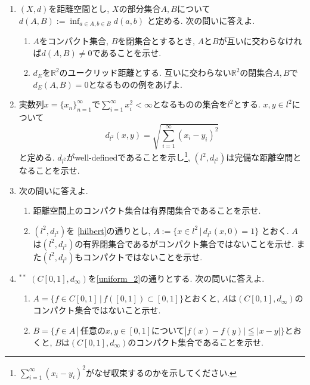 \documentclass[dvipdfmx,a4paper,11pt]{article}
\newcommand{\R}{\mathbb{R}}
\theoremstyle{definition}
\begin{document}
\begin{enumerate}[label=\textbf{問}\ref*{sec-completion}.\arabic*]

\item $(X,d)$を距離空間とし, $X$の部分集合$A,B$について
$d(A,B) := \inf_{a \in A, b \in B} d(a,b)$
と定める. 次の問いに答えよ.
\begin{enumerate}
 \setlength{\parskip}{0cm}
  \setlength{\itemsep}{0pt} 
	\item $A$をコンパクト集合, $B$を閉集合とするとき, $A$と$B$が互いに交わらなければ$d(A,B)\neq 0$であることを示せ.
	\item $d_{E}$を$\R^2$のユークリッド距離とする. 互いに交わらない$\R^2$の閉集合$A,B$で$d_{E}(A,B) =0$となるものの例をあげよ.
\end{enumerate}


 \item  \label{hilbert} 実数列$x = \{ x_n\}_{n=1}^{\infty}$で$\sum_{i=1}^{\infty} x_{i}^{2} < \infty$となるものの集合を$l^2$とする.
 $x,y \in l^2$について
 $$
 d_{ l^2}(x,y) = \sqrt{ \sum_{i=1}^{\infty} (x_i - y_i)^2}
 $$
 と定める. $d_{ l^2}$がwell-definedであることを示し\footnote{$\sum_{i=1}^{\infty} (x_i - y_i)^2$がなぜ収束するのかを示してください.}, $(l^2,d_{ l^2})$は完備な距離空間となることを示せ. %
 
\item  次の問いに答えよ.
	\begin{enumerate}
	\setlength{\parskip}{0cm}
  \setlength{\itemsep}{0pt} 
	\item 距離空間上のコンパクト集合は有界閉集合であることを示せ.
	\item $(l^2,d_{ l^2})$を \ref{hilbert}の通りとし, 
	$
	A := \{ x  \in  l^2 \,|\, d_{ l^2}(x,0)=1\}
	$
	とおく. $A$は$(l^2,d_{ l^2})$の有界閉集合であるがコンパクト集合ではないことを示せ. また$(l^2,d_{ l^2})$もコンパクトではないことを示せ.
	 \end{enumerate}



\item $^{**}$ $(C[0,1], d_{\infty})$を\ref{uniform_2}の通りとする. 次の問いに答えよ.
\begin{enumerate}
\setlength{\parskip}{0cm}
  \setlength{\itemsep}{0pt} 
\item $A=\{ f \in C[0,1] \,|\, f([0,1]) \subset [0,1] \}$とおくと, $A$は$(C[0,1], d_{\infty})$のコンパクト集合ではないこと示せ.
\item $B=\{ f \in A \,|\, \text{任意の$x,y \in [0,1]$について}|f(x)-f(y)| \leqq |x-y| \}$とおくと, $B$は$(C[0,1], d_{\infty})$のコンパクト集合であることを示せ.%
\end{enumerate}



\end{enumerate}
\end{document}
